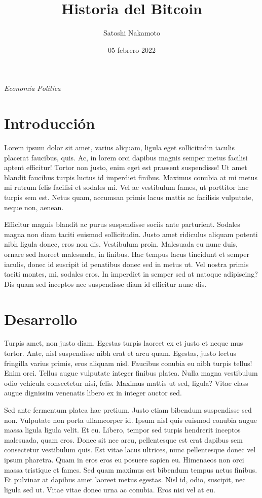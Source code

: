 \documentclass[12pt,spanish,]{article}
\title{Historia del Bitcoin}
\author{Satoshi Nakamoto}
\date{05 febrero 2022}
\makeatletter
\renewcommand{\maketitle}{\bgroup\vspace*{-1cm}\setlength{\parindent}{0pt}
\begin{flushleft}
  \textbf{\@title}

    \emph{Economía Política}
  
  \@date

\end{flushleft}\egroup
}
\makeatother
\begin{document}
\maketitle

\hypertarget{introducciuxf3n}{%
\section{Introducción}\label{introducciuxf3n}}

Lorem ipsum dolor sit amet, varius aliquam, ligula eget sollicitudin iaculis placerat faucibus, quis. Ac, in lorem orci dapibus magnis semper metus facilisi aptent efficitur! Tortor non justo, enim eget est praesent suspendisse! Ut amet blandit faucibus turpis luctus id imperdiet finibus. Maximus conubia at mi metus mi rutrum felis facilisi et sodales mi. Vel ac vestibulum fames, ut porttitor hac turpis sem est. Netus quam, accumsan primis lacus mattis ac facilisis vulputate, neque non, aenean.

Efficitur magnis blandit ac purus suspendisse sociis ante parturient. Sodales magna non diam taciti euismod sollicitudin. Justo amet ridiculus aliquam potenti nibh ligula donec, eros non dis. Vestibulum proin. Malesuada eu nunc duis, ornare sed laoreet malesuada, in finibus. Hac tempus lacus tincidunt et semper iaculis, donec id suscipit id penatibus donec sed in metus ut. Vel nostra primis taciti montes, mi, sodales eros. In imperdiet in semper sed at natoque adipiscing? Dis quam sed inceptos nec suspendisse diam id efficitur nunc dis.

\hypertarget{desarrollo}{%
\section{Desarrollo}\label{desarrollo}}

Turpis amet, non justo diam. Egestas turpis laoreet ex et justo et neque mus tortor. Ante, nisl suspendisse nibh erat et arcu quam. Egestas, justo lectus fringilla varius primis, eros aliquam nisl. Faucibus conubia eu nibh turpis tellus! Enim orci. Tellus augue vulputate integer finibus platea. Nulla magna vestibulum odio vehicula consectetur nisi, felis. Maximus mattis ut sed, ligula? Vitae class augue dignissim venenatis libero ex in integer auctor sed.

Sed ante fermentum platea hac pretium. Justo etiam bibendum suspendisse sed non. Vulputate non porta ullamcorper id. Ipsum nisl quis euismod conubia augue massa ligula ligula velit. Et eu. Libero, tempor sed turpis hendrerit inceptos malesuada, quam eros. Donec sit nec arcu, pellentesque est erat dapibus sem consectetur vestibulum quis. Est vitae lacus ultrices, nunc pellentesque donec vel ipsum pharetra. Quam in eros eros eu posuere sapien eu. Himenaeos non orci massa tristique et fames. Sed quam maximus est bibendum tempus netus finibus. Et pulvinar at dapibus amet laoreet metus egestas. Nisl id, odio, suscipit, nec ligula sed ut. Vitae vitae donec urna ac conubia. Eros nisi vel at eu.
\end{document}
